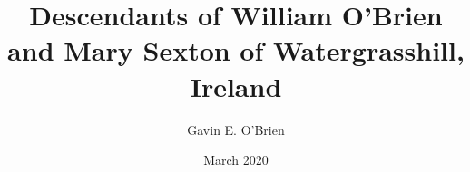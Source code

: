 \documentclass[oneside,letterpaper,12pt]{memoir}
\begin{document}
\author{Gavin E. O'Brien}
\title{Descendants of William O'Brien and Mary Sexton of Watergrasshill, Ireland}
\date{March 2020}

\maketitle
\tableofcontents

%




\end{document}

